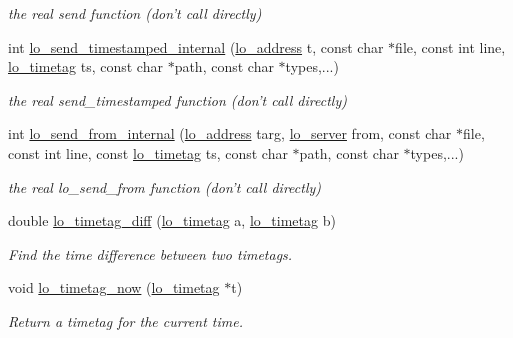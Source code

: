 \begin{CompactItemize}
\begin{CompactList}\small\item\em the real send function (don't call directly) \item\end{CompactList}\item 
int \hyperlink{group__liblolowlevel_gdeddaa8c418eec4600ef1f3099d24f42}{lo\_\-send\_\-timestamped\_\-internal} (\hyperlink{lo__types_8h_bf9b53223467de596b89e1377b0f3f3d}{lo\_\-address} t, const char $\ast$file, const int line, \hyperlink{structlo__timetag}{lo\_\-timetag} ts, const char $\ast$path, const char $\ast$types,...)
\begin{CompactList}\small\item\em the real send\_\-timestamped function (don't call directly) \item\end{CompactList}\item 
int \hyperlink{group__liblolowlevel_gcf95994303f815825ed7053b9519ca3f}{lo\_\-send\_\-from\_\-internal} (\hyperlink{lo__types_8h_bf9b53223467de596b89e1377b0f3f3d}{lo\_\-address} targ, \hyperlink{lo__types_8h_59067bf50cf8abb4371da6f03c9036c9}{lo\_\-server} from, const char $\ast$file, const int line, const \hyperlink{structlo__timetag}{lo\_\-timetag} ts, const char $\ast$path, const char $\ast$types,...)
\begin{CompactList}\small\item\em the real lo\_\-send\_\-from function (don't call directly) \item\end{CompactList}\item 
double \hyperlink{group__liblolowlevel_g9937fce1bfce695b01cd3289ead8b919}{lo\_\-timetag\_\-diff} (\hyperlink{structlo__timetag}{lo\_\-timetag} a, \hyperlink{structlo__timetag}{lo\_\-timetag} b)
\begin{CompactList}\small\item\em Find the time difference between two timetags. \item\end{CompactList}\item 
void \hyperlink{group__liblolowlevel_gd687e21ed611e68748e962502ae63d8e}{lo\_\-timetag\_\-now} (\hyperlink{structlo__timetag}{lo\_\-timetag} $\ast$t)
\begin{CompactList}\small\item\em Return a timetag for the current time. \item\end{CompactList}\end{CompactItemize}


